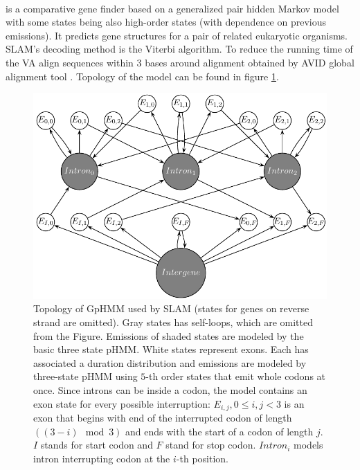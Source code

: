 \paragraph{}
 \cite{SLAM2003}  is a comparative gene finder based on a
generalized pair hidden Markov model \cite{Alexanderson2004} with some states
being also high-order states (with dependence on previous emissions). It
predicts gene structures for a pair of related eukaryotic organisms. SLAM's
decoding method is the Viterbi algorithm.  To reduce the running time of the VA
align sequences within $3$ bases around alignment obtained by AVID global
alignment tool \cite{Bray2003}. 
Topology of the model can be found in figure
\ref{FIGURE:SLAM}.

\begin{figure}
\begin{center}
\includegraphics{../figures/slam.pdf}
\end{center}
\caption[HMM topology of SLAM's GpHMM]{
Topology of GpHMM used by SLAM (states for genes on reverse strand are omitted).
Gray states has self-loops, which are omitted from the Figure.
Emissions of shaded states are modeled by the basic
three state pHMM. White states represent exons. Each has associated a duration
distribution and emissions are  modeled by three-state pHMM using $5$-th
order states that emit whole codons at once. Since introns can be inside a
codon, the model contains an exon state for every possible interruption:
$E_{i,j},0\leq i,j<3$ is an exon that begins with end of the interrupted codon of
length $((3-i)\mod 3)$ and ends with the start of a codon of length $j$. $I$
stands for start codon and $F$ stand for stop codon.  $Intron_i$ models intron interrupting codon at the
$i$-th position.
}\label{FIGURE:SLAM} \end{figure}

